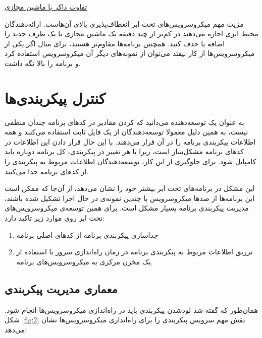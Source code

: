 \documentclass[a4paper,12pt]{book}
\begin{document}
\href{https://nickjanetakis.com/blog/comparing-virtual-machines-vs-docker-containers}
{ تفاوت داکر با ماشین مجازی}

\vskip 0.5cm
مزیت مهم میکروسرویس‌های تحت ابر انعطاف‌پذیری بالای آن‌هاست. ارائه‌دهندگان محیط ابری اجازه می‌دهند در کم‌تر از چند دقیقه یک ماشین مجازی یا یک ظرف جدید را اضافه یا حذف کنید. همچنین برنامه‌ها مقاوم‌تر هستند، برای مثال اگر یکی از میکروسرویس‌ها از کار بیفتد می‌توان از نمونه‌های دیگر آن میکروسرویس استفاده کرد و برنامه را بالا نگه داشت. 











\chapter{کنترل پیکربندی‌ها}
به عنوان یک توسعه‌دهنده می‌دانید که
کردن مقادیر در کدهای برنامه چندان منطقی نیست، به همین دلیل معمولا توسعه‌دهندگان از یک فایل ثابت استفاده می‌کنند و همه اطلاعات پیکربندی برنامه را در آن قرار می‌دهند. با این حال قرار دادن این اطلاعات در کدهای برنامه مشکل‌ساز است، زیرا با هر تغییر در پیکربندی، کل برنامه دوباره باید کامپایل شود. برای جلوگیری از این کار، توسعه‌دهندگان اطلاعات مربوط به پیکربندی را از کدهای برنامه جدا می‌کنند. 

این مشکل در برنامه‌های تحت ابر بیشتر خود را نشان می‌دهد، از آن‌جا که ممکن است این برنامه‌ها از صدها میکروسرویس با چندین نمونه‌ی در حال اجرا تشکیل شده باشند، مدیریت پیکربندی برنامه بسیار مشکل است. برای همین توسعه‌ی میکروسرویس‌های تحت ابر روی موارد زیر تاکید دارد:
\begin{enumerate}
	\item جداسازی پیکربندی برنامه از کدهای اصلی برنامه
	\item تزریق اطلاعات مربوط به پیکربندی برنامه در زمان راه‌اندازی سرور با استفاده از یک مخرن مرکزی به میکروسرویس‌‌های برنامه.
\end{enumerate}


\section{معماری مدیریت پیکربندی}

همان‌طور که گفته شد لودشدن پیکربندی باید در راه‌‌اندازی میکروسرویس‌ها انجام شود. 
شکل \ref{fig:2} نقش مهم سرویس پیکربندی را برای راه‌اندازی میکروسرویس‌ها نشان می‌دهد:
\end{document}
